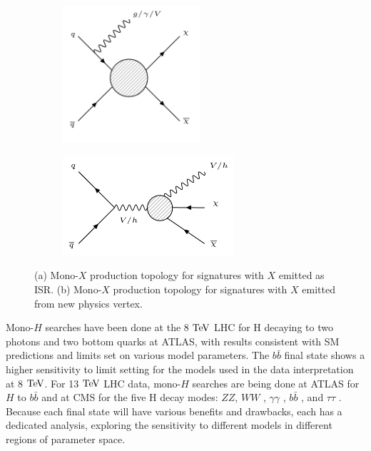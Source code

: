 \begin{figure}[tbh]
\centering
\begin{subfigure}{0.45\textwidth}
\centering
\includegraphics[width=2in]{figures/isr.png}
\caption{}
\label{fig:isr}
\end{subfigure}
\begin{subfigure}{0.45\textwidth}
\centering
\includegraphics[width=2.5in]{figures/fsr.png}
\caption{}
\label{fig:fsr}
\end{subfigure}
\caption{(a) Mono-$X$ production topology for signatures with $X$ emitted as ISR. (b) Mono-$X$ production topology for signatures with $X$ emitted from new physics vertex.}
\label{monox}
\end{figure}

Mono-$H$ searches have been done at the 8 $\mathrm{Te\kern -0.1em V}$ LHC for H decaying to two photons \cite{Aad:2015yga} and two bottom quarks \cite{Aad:2015dva} at ATLAS, with results consistent with SM predictions and limits set on various model parameters. The $b\bar{b}$ final state shows a higher sensitivity to limit setting for the models used in the data interpretation at 8 $\mathrm{Te\kern -0.1em V}$. For 13 $\mathrm{Te\kern -0.1em V}$ LHC data, mono-$H$ searches are being done at ATLAS for $H$ to $b\bar{b}$ \cite{Atlas:2016Hbb} and at CMS for the five H decay modes: $ZZ$, $WW$ \cite{CMS-AN-15-338}, $\gamma\gamma$ \cite{CMS-AN-15-203}, $b\bar{b}$ \cite{CMS-AN-15-209}, and $\tau\tau$ \cite{CMS-AN-15-???}. Because each final state will have various benefits and drawbacks, each has a dedicated analysis, exploring the sensitivity to different models in different regions of parameter space.

